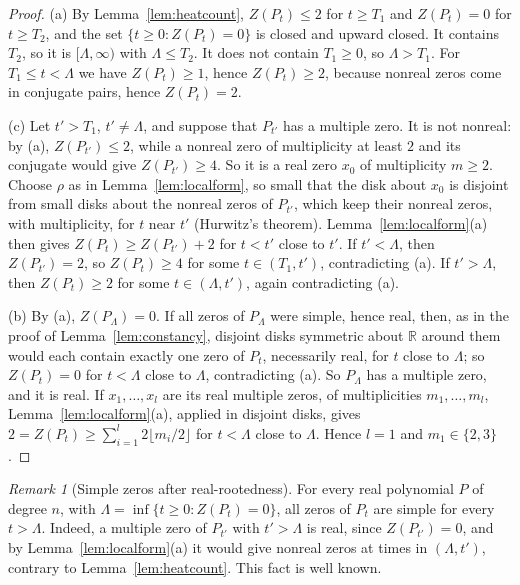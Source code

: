 \documentclass[11pt]{amsart}
\theoremstyle{definition}
\theoremstyle{remark}
\newtheorem{remark}[theorem]{Remark}
\numberwithin{equation}{section}
\newcommand{\R}{\mathbb{R}}
\begin{document}
\begin{proof}
(a) By Lemma~\ref{lem:heatcount}, $Z(P_t)\le2$ for $t\ge T_1$ and $Z(P_t)=0$ for $t\ge T_2$, and the set $\{t\ge0:Z(P_t)=0\}$ is closed and upward closed. It contains $T_2$, so it is $[\Lambda,\infty)$ with $\Lambda\le T_2$. It does not contain $T_1\ge0$, so $\Lambda>T_1$. For $T_1\le t<\Lambda$ we have $Z(P_t)\ge1$, hence $Z(P_t)\ge2$, because nonreal zeros come in conjugate pairs, hence $Z(P_t)=2$.

(c) Let $t'>T_1$, $t'\ne\Lambda$, and suppose that $P_{t'}$ has a multiple zero. It is not nonreal: by (a), $Z(P_{t'})\le2$, while a nonreal zero of multiplicity at least $2$ and its conjugate would give $Z(P_{t'})\ge4$. So it is a real zero $x_0$ of multiplicity $m\ge2$. Choose $\rho$ as in Lemma~\ref{lem:localform}, so small that the disk about $x_0$ is disjoint from small disks about the nonreal zeros of $P_{t'}$, which keep their nonreal zeros, with multiplicity, for $t$ near $t'$ (Hurwitz's theorem). Lemma~\ref{lem:localform}(a) then gives $Z(P_t)\ge Z(P_{t'})+2$ for $t<t'$ close to $t'$. If $t'<\Lambda$, then $Z(P_{t'})=2$, so $Z(P_t)\ge4$ for some $t\in(T_1,t')$, contradicting (a). If $t'>\Lambda$, then $Z(P_t)\ge2$ for some $t\in(\Lambda,t')$, again contradicting (a).

(b) By (a), $Z(P_\Lambda)=0$. If all zeros of $P_\Lambda$ were simple, hence real, then, as in the proof of Lemma~\ref{lem:constancy}, disjoint disks symmetric about $\R$ around them would each contain exactly one zero of $P_t$, necessarily real, for $t$ close to $\Lambda$; so $Z(P_t)=0$ for $t<\Lambda$ close to $\Lambda$, contradicting (a). So $P_\Lambda$ has a multiple zero, and it is real. If $x_1,\dots,x_l$ are its real multiple zeros, of multiplicities $m_1,\dots,m_l$, Lemma~\ref{lem:localform}(a), applied in disjoint disks, gives $2=Z(P_t)\ge\sum_{i=1}^l2\lfloor m_i/2\rfloor$ for $t<\Lambda$ close to $\Lambda$. Hence $l=1$ and $m_1\in\{2,3\}$.
\end{proof}

\begin{remark}[Simple zeros after real-rootedness]\label{rem:simple-after}
For every real polynomial $P$ of degree $n$, with $\Lambda=\inf\{t\ge0:Z(P_t)=0\}$, all zeros of $P_t$ are simple for every $t>\Lambda$. Indeed, a multiple zero of $P_{t'}$ with $t'>\Lambda$ is real, since $Z(P_{t'})=0$, and by Lemma~\ref{lem:localform}(a) it would give nonreal zeros at times in $(\Lambda,t')$, contrary to Lemma~\ref{lem:heatcount}. This fact is well known.
\end{remark}
\end{document}
